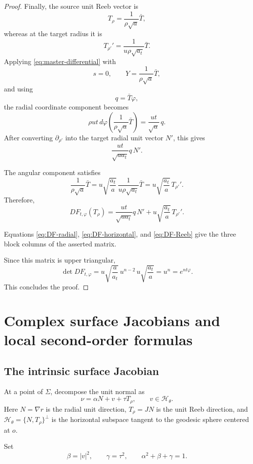 \documentclass[11pt,reqno]{amsart}
\numberwithin{equation}{section}
\theoremstyle{definition}
\theoremstyle{remark}
\begin{document}
\begin{proof}
Finally, the source unit Reeb vector is
\[
T_\rho
=
\frac{1}{\rho\sqrt a}\bar T,
\]
whereas at the target radius it is
\[
T_{\rho'}'
=
\frac{1}{u\rho\sqrt{a_t}}\bar T.
\]
Applying \eqref{eq:master-differential} with
\[
s=0,
\qquad
Y=\frac{1}{\rho\sqrt a}\bar T,
\]
and using
\[
q=\bar T\varphi,
\]
the radial coordinate component becomes
\[
\rho ut\,
d\varphi\left(
\frac{1}{\rho\sqrt a}\bar T
\right)
=
\frac{ut}{\sqrt a}\,q.
\]
After converting $\partial_{\rho'}$ into the target radial unit
vector $N'$, this gives
\[
\frac{ut}{\sqrt{aa_t}}q\,N'.
\]

The angular component satisfies
\[
\frac{1}{\rho\sqrt a}\bar T
=
u\sqrt{\frac{a_t}{a}}\,
\frac{1}{u\rho\sqrt{a_t}}\bar T
=
u\sqrt{\frac{a_t}{a}}\,T_{\rho'}'.
\]
Therefore,
\begin{equation}
DF_{t,\varphi}(T_\rho)
=
\frac{ut}{\sqrt{aa_t}}q\,N'
+
u\sqrt{\frac{a_t}{a}}\,T_{\rho'}'.
\label{eq:DF-Reeb}
\end{equation}

Equations \eqref{eq:DF-radial}, \eqref{eq:DF-horizontal}, and
\eqref{eq:DF-Reeb} give the three block columns of the asserted
matrix.

Since this matrix is upper triangular,
\[
\det DF_{t,\varphi}
=
u\sqrt{\frac{a}{a_t}}\,
u^{n-2}\,
u\sqrt{\frac{a_t}{a}}
=
u^n
=
e^{nt\varphi}.
\]
This concludes the proof.
\end{proof}

\section{Complex surface Jacobians and local second-order formulas}\label{sec:surface-trace}

\subsection{The intrinsic surface Jacobian}

At a point of \(\Sigma\), decompose the unit normal as
\[
\nu
=
\alpha N+v+\tau T_\rho,
\qquad
v\in\mathcal H_\theta.
\]
Here \(N=\nabla r\) is the radial unit direction, \(T_\rho=JN\) is the unit
Reeb direction, and \(\mathcal H_\theta=\{N,T_\rho\}^{\perp}\) is the
horizontal subspace tangent to the geodesic sphere centered at \(o\).

Set
\[
\beta=|v|^2,
\qquad
\gamma=\tau^2,
\qquad
\alpha^2+\beta+\gamma=1.
\]
\end{document}
